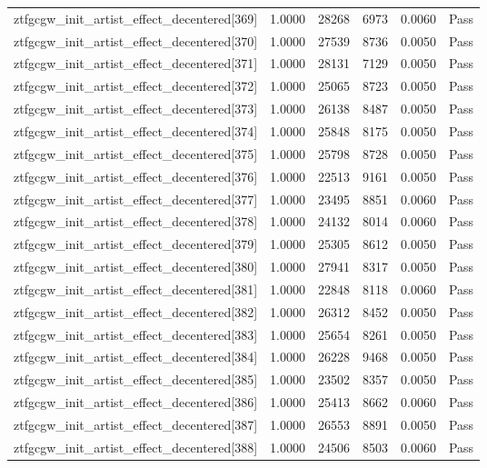 \begin{table}[htbp]
\begin{tabular}{llrrll}
ztfgcgw\_init\_artist\_effect\_decentered[369] & 1.0000 & 28268 & 6973 & 0.0060 & Pass \\
ztfgcgw\_init\_artist\_effect\_decentered[370] & 1.0000 & 27539 & 8736 & 0.0050 & Pass \\
ztfgcgw\_init\_artist\_effect\_decentered[371] & 1.0000 & 28131 & 7129 & 0.0050 & Pass \\
ztfgcgw\_init\_artist\_effect\_decentered[372] & 1.0000 & 25065 & 8723 & 0.0050 & Pass \\
ztfgcgw\_init\_artist\_effect\_decentered[373] & 1.0000 & 26138 & 8487 & 0.0050 & Pass \\
ztfgcgw\_init\_artist\_effect\_decentered[374] & 1.0000 & 25848 & 8175 & 0.0050 & Pass \\
ztfgcgw\_init\_artist\_effect\_decentered[375] & 1.0000 & 25798 & 8728 & 0.0050 & Pass \\
ztfgcgw\_init\_artist\_effect\_decentered[376] & 1.0000 & 22513 & 9161 & 0.0050 & Pass \\
ztfgcgw\_init\_artist\_effect\_decentered[377] & 1.0000 & 23495 & 8851 & 0.0060 & Pass \\
ztfgcgw\_init\_artist\_effect\_decentered[378] & 1.0000 & 24132 & 8014 & 0.0060 & Pass \\
ztfgcgw\_init\_artist\_effect\_decentered[379] & 1.0000 & 25305 & 8612 & 0.0050 & Pass \\
ztfgcgw\_init\_artist\_effect\_decentered[380] & 1.0000 & 27941 & 8317 & 0.0050 & Pass \\
ztfgcgw\_init\_artist\_effect\_decentered[381] & 1.0000 & 22848 & 8118 & 0.0060 & Pass \\
ztfgcgw\_init\_artist\_effect\_decentered[382] & 1.0000 & 26312 & 8452 & 0.0050 & Pass \\
ztfgcgw\_init\_artist\_effect\_decentered[383] & 1.0000 & 25654 & 8261 & 0.0050 & Pass \\
ztfgcgw\_init\_artist\_effect\_decentered[384] & 1.0000 & 26228 & 9468 & 0.0050 & Pass \\
ztfgcgw\_init\_artist\_effect\_decentered[385] & 1.0000 & 23502 & 8357 & 0.0050 & Pass \\
ztfgcgw\_init\_artist\_effect\_decentered[386] & 1.0000 & 25413 & 8662 & 0.0060 & Pass \\
ztfgcgw\_init\_artist\_effect\_decentered[387] & 1.0000 & 26553 & 8891 & 0.0050 & Pass \\
ztfgcgw\_init\_artist\_effect\_decentered[388] & 1.0000 & 24506 & 8503 & 0.0060 & Pass \\

\end{tabular}
\end{table}
